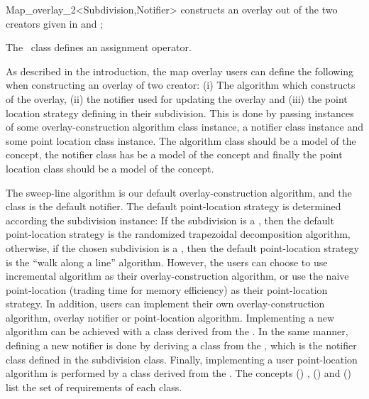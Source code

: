 \begin{ccRefClass}{Map_overlay_2<Subdivision,Notifier>}
  {constructs an overlay out of the two creators given in  and ;}
  

The \ccClassTemplateName\ class defines an assignment operator.


\begin{ccAdvanced}


As described in the introduction, the map overlay users can define 
the following when constructing an overlay of two creator:
(i) The algorithm which constructs of the overlay, 
(ii) the notifier used for updating the overlay and 
(iii) the point location strategy defining in their subdivision. 
This is done by passing instances of some overlay-construction 
algorithm class instance, a notifier class instance 
and some point location class instance. 
The algorithm class should be a model of the  concept,
the notifier class has be a model of the  concept
and finally the point location class should be a model of the
 concept. 

The sweep-line algorithm is our default overlay-construction algorithm,
and the  class is the default notifier.
The default point-location strategy is determined according the subdivision instance:
If the subdivision is a , then the default point-location 
strategy is the randomized trapezoidal decomposition algorithm, otherwise,
if the chosen subdivision is a , then 
the default point-location strategy is the ``walk along a line'' algorithm. 
However, the users can choose to use incremental algorithm as their overlay-construction 
algorithm, or use the naive point-location (trading time for memory efficiency) as 
their point-location strategy.
In addition, users can implement their own overlay-construction algorithm, 
overlay notifier or point-location algorithm. 
Implementing a new algorithm can be achieved with a class derived from the 
. 
In the same manner, defining a new notifier is done by deriving a class from the 
, which is the 
notifier class defined in the subdivision class.
Finally, implementing a user point-location algorithm is performed by a 
class derived from the .
The concepts  ()
,  () and 
 () 
list the set of requirements of each class.


\end{ccAdvanced}
\end{ccRefClass}
